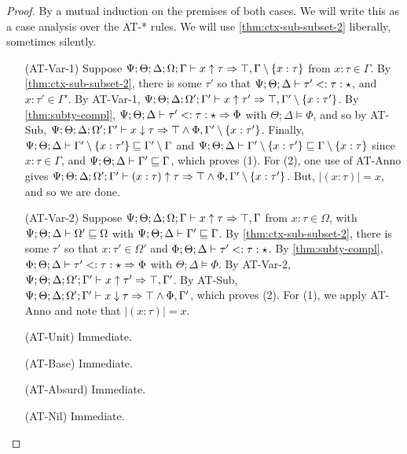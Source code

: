 \begin{proof}
By a mutual induction on the premises of both cases. We will write this as a case analysis over the AT-* rules.
We will use \autoref{thm:ctx-sub-subset-2} liberally, sometimes silently.
\begin{itemize}
  \item[(AT-Var-1)] Suppose $\Psi ; \Theta ; \Delta; \Omega ; \Gamma \vdash x \uparrow \tau \Rightarrow \top, \Gamma \setminus \{x : \tau\}$ from $x : \tau \in \Gamma$.
  By \autoref{thm:ctx-sub-subset-2}, there is some $\tau'$ so that $\Psi ; \Theta ; \Delta \vdash \tau' <: \tau : \star$, and $x : \tau' \in \Gamma'$.
  By AT-Var-1, $\Psi ; \Theta ; \Delta; \Omega' ; \Gamma' \vdash x \uparrow \tau' \Rightarrow \top, \Gamma' \setminus \{x : \tau'\}$.
  By \autoref{thm:subty-compl},  $\Psi ; \Theta ; \Delta \vdash \tau' <: \tau : \star \Rightarrow \Phi$ with $\Theta ; \Delta \vDash \Phi$, and so by AT-Sub,
  $\Psi ; \Theta ; \Delta; \Omega' ; \Gamma' \vdash x \downarrow \tau \Rightarrow \top \wedge \Phi, \Gamma' \setminus \{x : \tau'\}$. Finally, $\Psi ; \Theta ; \Delta \vdash \Gamma' \setminus \{x : \tau'\} \sqsubseteq \Gamma' \setminus \Gamma$ and $\Psi ; \Theta ; \Delta \vdash \Gamma' \setminus \{x : \tau'\} \sqsubseteq \Gamma \setminus \{x : \tau\}$ since $x : \tau \in \Gamma$, and $\Psi ; \Theta ; \Delta \vdash \Gamma' \sqsubseteq \Gamma$, which proves (1). For (2), one use of AT-Anno gives $\Psi ; \Theta ; \Delta; \Omega' ; \Gamma' \vdash (x : \tau) \uparrow \tau \Rightarrow \top \wedge \Phi, \Gamma' \setminus \{x : \tau'\}$. But, $|(x : \tau)| = x$, and so we are done.
  
  \item[(AT-Var-2)] Suppose $\Psi ; \Theta ; \Delta ; \Omega ; \Gamma\vdash x \uparrow \tau \Rightarrow \top, \Gamma$ from $x : \tau \in \Omega$, with $\Psi ; \Theta ; \Delta \vdash \Omega' \sqsubseteq \Omega$ with $\Psi ; \Theta ; \Delta \vdash \Gamma' \sqsubseteq \Gamma$. By \autoref{thm:ctx-sub-subset-2}, there is some $\tau'$ so that $x : \tau' \in \Omega'$ and $\Phi ; \Theta ; \Delta \vdash \tau' <: \tau : \star$. By \autoref{thm:subty-compl}, $\Phi ; \Theta ; \Delta \vdash \tau' <: \tau : \star \Rightarrow \Phi$ with $\Theta ; \Delta \vDash \Phi$. 
  By AT-Var-2, $\Psi ; \Theta ; \Delta ; \Omega' ; \Gamma' \vdash x \uparrow \tau' \Rightarrow \top, \Gamma'$. By AT-Sub, 
  $\Psi ; \Theta ; \Delta ; \Omega' ; \Gamma' \vdash x \downarrow \tau \Rightarrow \top \wedge \Phi, \Gamma'$, which proves (2). For (1), we apply AT-Anno and note that $|(x : \tau)| = x$.
  
  \item[(AT-Unit)] Immediate.
  \item[(AT-Base)] Immediate.
  \item[(AT-Absurd)] Immediate.
  \item[(AT-Nil)] Immediate.
  

\end{itemize}
\end{proof}
